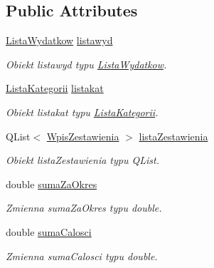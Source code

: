 \subsection*{Public Attributes}
\begin{DoxyCompactItemize}
\item 
\hypertarget{class_menager_wydatkow_a3c981ccfc77f7f37e0d64c2a3897a7d0}{}\hyperlink{class_lista_wydatkow}{Lista\+Wydatkow} \hyperlink{class_menager_wydatkow_a3c981ccfc77f7f37e0d64c2a3897a7d0}{listawyd}\label{class_menager_wydatkow_a3c981ccfc77f7f37e0d64c2a3897a7d0}

\begin{DoxyCompactList}\small\item\em Obiekt listawyd typu \hyperlink{class_lista_wydatkow}{Lista\+Wydatkow}. \end{DoxyCompactList}\item 
\hypertarget{class_menager_wydatkow_a743a1a6ee65317e05e0efda038f2e104}{}\hyperlink{class_lista_kategorii}{Lista\+Kategorii} \hyperlink{class_menager_wydatkow_a743a1a6ee65317e05e0efda038f2e104}{listakat}\label{class_menager_wydatkow_a743a1a6ee65317e05e0efda038f2e104}

\begin{DoxyCompactList}\small\item\em Obiekt listakat typu \hyperlink{class_lista_kategorii}{Lista\+Kategorii}. \end{DoxyCompactList}\item 
\hypertarget{class_menager_wydatkow_a86bfd62a21e66b68a7f94550398a13a1}{}Q\+List$<$ \hyperlink{class_wpis_zestawienia}{Wpis\+Zestawienia} $>$ \hyperlink{class_menager_wydatkow_a86bfd62a21e66b68a7f94550398a13a1}{lista\+Zestawienia}\label{class_menager_wydatkow_a86bfd62a21e66b68a7f94550398a13a1}

\begin{DoxyCompactList}\small\item\em Obiekt lista\+Zestawienia typu Q\+List. \end{DoxyCompactList}\item 
\hypertarget{class_menager_wydatkow_a7f7d9dbb9e0ab215b725eff718596e10}{}double \hyperlink{class_menager_wydatkow_a7f7d9dbb9e0ab215b725eff718596e10}{suma\+Za\+Okres}\label{class_menager_wydatkow_a7f7d9dbb9e0ab215b725eff718596e10}

\begin{DoxyCompactList}\small\item\em Zmienna suma\+Za\+Okres typu double. \end{DoxyCompactList}\item 
\hypertarget{class_menager_wydatkow_a5620729078154b1911a15c999ddb87e9}{}double \hyperlink{class_menager_wydatkow_a5620729078154b1911a15c999ddb87e9}{suma\+Calosci}\label{class_menager_wydatkow_a5620729078154b1911a15c999ddb87e9}

\begin{DoxyCompactList}\small\item\em Zmienna suma\+Calosci typu double. \end{DoxyCompactList}\end{DoxyCompactItemize}


